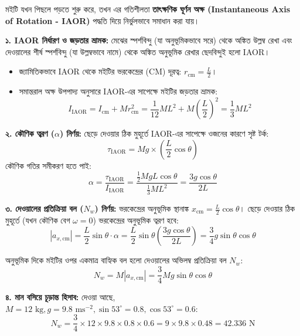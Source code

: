 \documentclass[12pt, a4paper]{article}
\begin{document}
\begin{tcolorbox}[solutionbox={সমাধান (Solution)}]
\noindent
মইটি যখন পিছলে পড়তে শুরু করে, তখন এর গতিশীলতা \textbf{তাৎক্ষণিক ঘূর্ণন অক্ষ (Instantaneous Axis of Rotation - IAOR)} পদ্ধতি দিয়ে নির্ভুলভাবে সমাধান করা যায়।

\vspace{0.5em}
\textbf{১. IAOR নির্ধারণ ও জড়তার ভ্রামক:}
মেঝের স্পর্শবিন্দু (যা অনুভূমিকভাবে সরে) থেকে অঙ্কিত উল্লম্ব রেখা এবং দেওয়ালের শীর্ষ স্পর্শবিন্দু (যা উল্লম্বভাবে নামে) থেকে অঙ্কিত অনুভূমিক রেখার ছেদবিন্দুই হলো IAOR। 
\begin{itemize}[leftmargin=1.5em, itemsep=0.2em]
    \item জ্যামিতিকভাবে IAOR থেকে মইটির ভরকেন্দ্রের (CM) দূরত্ব: $r_{\text{cm}} = \frac{L}{2}$।
    \item সমান্তরাল অক্ষ উপপাদ্য অনুসারে IAOR-এর সাপেক্ষে মইটির জড়তার ভ্রামক:
    $$I_{\text{IAOR}} = I_{\text{cm}} + M r_{\text{cm}}^2 = \frac{1}{12} M L^2 + M \left(\frac{L}{2}\right)^2 = \frac{1}{3} M L^2$$
\end{itemize}

\vspace{0.5em}
\textbf{২. কৌণিক ত্বরণ ($\alpha$) নির্ণয়:}
ছেড়ে দেওয়ার ঠিক মুহূর্তে IAOR-এর সাপেক্ষে ওজনের কারণে সৃষ্ট টর্ক:
$$\tau_{\text{IAOR}} = M g \times \left(\frac{L}{2} \cos\theta\right)$$
কৌণিক গতির সমীকরণ হতে পাই:
$$\alpha = \frac{\tau_{\text{IAOR}}}{I_{\text{IAOR}}} = \frac{\frac{1}{2} M g L \cos\theta}{\frac{1}{3} M L^2} = \frac{3 g \cos\theta}{2 L}$$

\vspace{0.5em}
\textbf{৩. দেওয়ালের প্রতিক্রিয়া বল ($N_w$) নির্ণয়:}
ভরকেন্দ্রের অনুভূমিক স্থানাঙ্ক $x_{\text{cm}} = \frac{L}{2} \cos\theta$। 
ছেড়ে দেওয়ার ঠিক মুহূর্তে (যখন কৌণিক বেগ $\omega = 0$) ভরকেন্দ্রের অনুভূমিক ত্বরণ হবে:
$$|a_{x, \text{cm}}| = \frac{L}{2} \sin\theta \cdot \alpha = \frac{L}{2} \sin\theta \left(\frac{3 g \cos\theta}{2 L}\right) = \frac{3}{4} g \sin\theta \cos\theta$$

অনুভূমিক দিকে মইটির ওপর একমাত্র বাহ্যিক বল হলো দেওয়ালের অভিলম্ব প্রতিক্রিয়া বল $N_w$:
$$N_w = M |a_{x, \text{cm}}| = \frac{3}{4} M g \sin\theta \cos\theta$$

\vspace{0.5em}
\textbf{৪. মান বসিয়ে চূড়ান্ত হিসাব:}
দেওয়া আছে, $M = 12\text{ kg}, g = 9.8\text{ ms}^{-2}, \sin 53^\circ = 0.8, \cos 53^\circ = 0.6$:
$$N_w = \frac{3}{4} \times 12 \times 9.8 \times 0.8 \times 0.6 = 9 \times 9.8 \times 0.48 = 42.336\text{ N}$$
\end{tcolorbox}
\vspace{1em}
\end{document}
